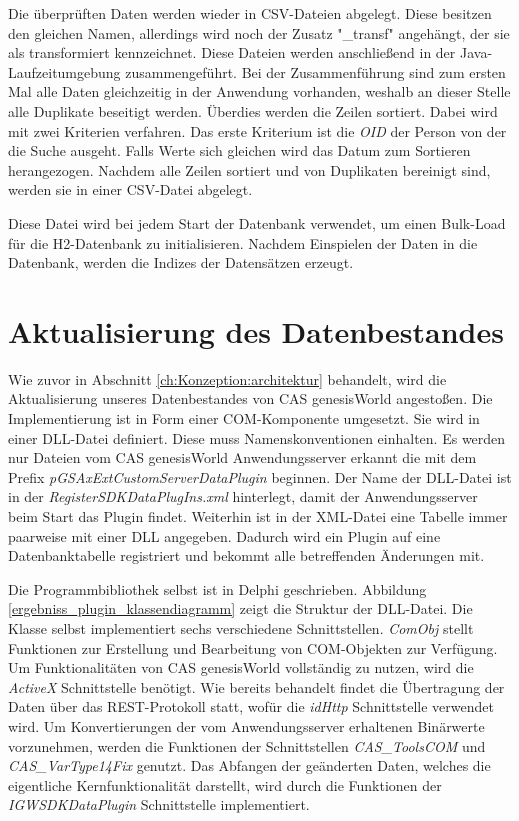 Die überprüften Daten werden wieder in CSV-Dateien abgelegt. Diese besitzen den gleichen Namen, allerdings wird noch der Zusatz "\_transf" angehängt, der sie als transformiert kennzeichnet. Diese Dateien werden anschließend in der Java-Laufzeitumgebung zusammengeführt. Bei der Zusammenführung sind zum ersten Mal alle Daten gleichzeitig in der Anwendung vorhanden, weshalb an dieser Stelle alle Duplikate beseitigt werden. Überdies werden die Zeilen sortiert. Dabei wird mit zwei Kriterien verfahren. Das erste Kriterium ist die \textit{OID} der Person von der die Suche ausgeht. Falls Werte sich gleichen wird das Datum zum Sortieren herangezogen. Nachdem alle Zeilen sortiert und von Duplikaten bereinigt sind, werden sie in einer CSV-Datei abgelegt. 

Diese Datei wird bei jedem Start der Datenbank verwendet, um einen Bulk-Load für die H2-Datenbank zu initialisieren. Nachdem Einspielen der Daten in die Datenbank, werden die Indizes der Datensätzen erzeugt.

\section{Aktualisierung des Datenbestandes}

Wie zuvor in Abschnitt \ref{ch:Konzeption:architektur} behandelt, wird die Aktualisierung unseres Datenbestandes von CAS genesisWorld angestoßen. Die Implementierung ist in Form einer COM-Komponente umgesetzt. Sie wird in einer DLL-Datei definiert. Diese muss Namenskonventionen einhalten. Es werden nur Dateien vom CAS genesisWorld Anwendungsserver erkannt die mit dem Prefix \textit{pGSAxExtCustomServerDataPlugin} beginnen. Der Name der DLL-Datei ist in der \textit{RegisterSDKDataPlugIns.xml} hinterlegt, damit der Anwendungsserver beim Start das Plugin findet. Weiterhin ist in der XML-Datei eine Tabelle immer paarweise mit einer DLL angegeben. Dadurch wird ein Plugin auf eine Datenbanktabelle registriert und bekommt alle betreffenden Änderungen mit.

Die Programmbibliothek selbst ist in Delphi geschrieben. Abbildung \ref{ergebniss_plugin_klassendiagramm} zeigt die Struktur der DLL-Datei. Die Klasse selbst implementiert sechs verschiedene Schnittstellen. \textit{ComObj} stellt Funktionen zur Erstellung und Bearbeitung von COM-Objekten zur Verfügung. Um Funktionalitäten von CAS genesisWorld vollständig zu nutzen, wird die \textit{ActiveX} Schnittstelle benötigt. Wie bereits behandelt findet die Übertragung der Daten über das REST-Protokoll statt, wofür die \textit{idHttp} Schnittstelle verwendet wird. Um Konvertierungen der vom Anwendungsserver erhaltenen Binärwerte vorzunehmen, werden die Funktionen der Schnittstellen \textit{CAS\_ToolsCOM} und \textit{CAS\_VarType14Fix} genutzt. Das Abfangen der geänderten Daten, welches die eigentliche Kernfunktionalität darstellt, wird durch die Funktionen der \textit{IGWSDKDataPlugin} Schnittstelle implementiert.

